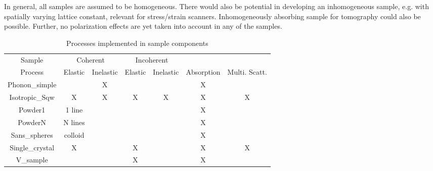 In general, all samples are assumed to be homogeneous. There would also be
potential in developing an inhomogeneous sample, e.g. with
spatially varying lattice constant, relevant for stress/strain scanners.
Inhomogeneously absorbing sample for tomography could also be possible.
Further, no polarization effects are yet taken into account in any
of the samples.

\begin{table}
  \begin{center}
  {\let\my=\\
    \begin{tabular}{|c|cc|cc|c|c|}
    \hline
    Sample        & \multicolumn{2}{c|}{Coherent} & \multicolumn{2}{c|}{Incoherent} &&\\
    Process       & Elastic & Inelastic & Elastic & Inelastic & Absorption & Multi. Scatt.\\
    \hline
    Phonon\_simple&         & X         &         &           & X & \\
    Isotropic\_Sqw&  X      & X         & X       & X         & X & X \\
    Powder1       &  1 line &           &         &           & X & \\
    PowderN       &  N lines&           &         &           & X & \\
    Sans\_spheres &  colloid&           &         &           & X & \\
    Single\_crystal& X      &           & X       &           & X & X \\
    V\_sample     &         &           & X       &           & X & \\
    \hline
    \end{tabular}
    \caption{Processes implemented in sample components}
    \label{t:sample-process}
  }
  \end{center}
\end{table}






%

